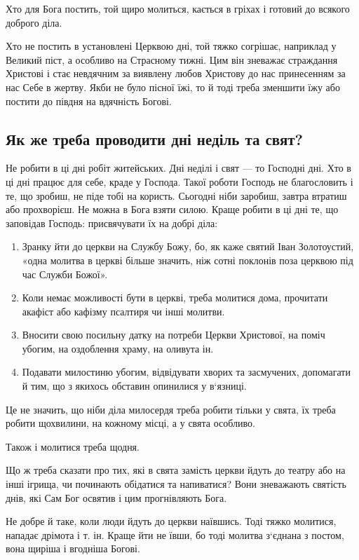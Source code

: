 \documentclass[main.tex]{subfiles}
\begin{document}
Хто для Бога постить, той щиро молиться, кається в гріхах і готовий до всякого доброго діла.

Хто не постить в установлені Церквою дні, той тяжко согрішає, наприклад у Великий піст, а особливо на Страсному тижні. Цим він зневажає страждання Христові і стає невдячним за виявлену любов Христову до нас принесенням за нас Себе в жертву. Якби не було пісної їжі, то й тоді треба зменшити їжу або постити до півдня на вдячність Богові.

\subsection{Як же треба проводити дні неділь та свят?}

Не робити в ці дні робіт житейських. Дні неділі і свят — то Господні дні. Хто в ці дні працює для себе, краде у Господа. Такої роботи Господь не благословить і те, що зробиш, не піде тобі на користь. Сьогодні ніби заробиш, завтра втратиш або прохворієш. Не можна в Бога взяти силою. Краще робити в ці дні те, що заповідав Господь: присвячувати їх на добрі діла:

\begin{enumerate}
    \item Зранку йти до церкви на Службу Божу, бо, як каже святий Іван Золотоустий, «одна молитва в церкві більше значить, ніж сотні поклонів поза церквою під час Служби Божої».
    \item Коли немає можливості бути в церкві, треба молитися дома, прочитати акафіст або кафізму псалтиря чи інші молитви.
    \item Вносити свою посильну датку на потреби Церкви Христової, на поміч убогим, на оздоблення храму, на оливута ін.
    \item Подавати милостиню убогим, відвідувати хворих та засмучених, допомагати й тим, що з якихось обставин опинилися у в`язниці.
\end{enumerate}

Це не значить, що ніби діла милосердя треба робити тільки у свята, їх треба робити щохвилини, на кожному місці, а у свята особливо.

Також і молитися треба щодня.

Що ж треба сказати про тих, які в свята замість церкви йдуть до театру або на інші ігрища, чи починають обідатися та напиватися? Вони зневажають святість днів, які Сам Бог освятив і цим прогнівляють Бога.
 
Не добре й таке, коли люди йдуть до церкви наївшись. Тоді тяжко молитися, нападає дрімота і т. ін. Краще йти не ївши, бо тоді молитва з`єднана з постом, вона щиріша і вгодніша Богові.
\end{document}
